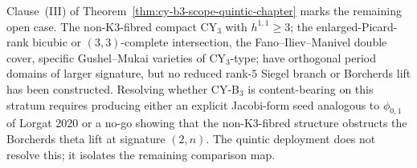 \begin{remark}
\label{rem:quintic-cy-b3-open-case}
Clause~(III) of Theorem~\ref{thm:cy-b3-scope-quintic-chapter} marks
the remaining open case. The non-K3-fibred compact
CY$_3$ with $h^{1, 1} \geq 3$; the enlarged-Picard-rank bicubic
or $(3, 3)$-complete intersection, the Fano--Iliev--Manivel double
cover, specific Gushel--Mukai varieties of CY$_3$-type; have
orthogonal period domains of larger signature, but no reduced
rank-\(5\) Siegel branch or Borcherds lift has been constructed. Resolving
whether CY-B$_3$ is content-bearing on this stratum requires
producing either an explicit Jacobi-form seed analogous to
$\phi_{0, 1}$ of Lorgat 2020 or a no-go showing that the
non-K3-fibred structure obstructs the Borcherds theta lift at
signature $(2, n)$. The quintic deployment does not resolve this;
it isolates the remaining comparison map.
\end{remark}
